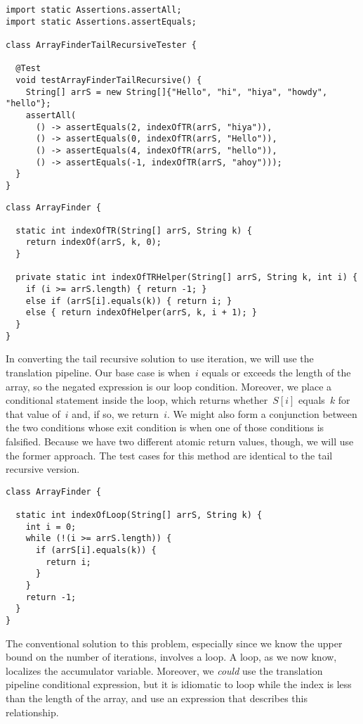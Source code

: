 \begin{lstlisting}[language=MyJava]
import static Assertions.assertAll;
import static Assertions.assertEquals;

class ArrayFinderTailRecursiveTester {

  @Test
  void testArrayFinderTailRecursive() {
    String[] arrS = new String[]{"Hello", "hi", "hiya", "howdy", "hello"};
    assertAll(
      () -> assertEquals(2, indexOfTR(arrS, "hiya")),
      () -> assertEquals(0, indexOfTR(arrS, "Hello")),
      () -> assertEquals(4, indexOfTR(arrS, "hello")),
      () -> assertEquals(-1, indexOfTR(arrS, "ahoy")));
  }
}
\end{lstlisting}

\begin{lstlisting}[language=MyJava]
class ArrayFinder {

  static int indexOfTR(String[] arrS, String k) {
    return indexOf(arrS, k, 0);
  }

  private static int indexOfTRHelper(String[] arrS, String k, int i) {
    if (i >= arrS.length) { return -1; } 
    else if (arrS[i].equals(k)) { return i; } 
    else { return indexOfHelper(arrS, k, i + 1); }
  } 
}
\end{lstlisting}

In converting the tail recursive solution to use iteration, we will use the translation pipeline. 
Our base case is when~$i$ equals or exceeds the length of the array, so the negated expression is our loop condition. 
Moreover, we place a conditional statement inside the loop, which returns whether~$S[i]$ equals~$k$ for that value of~$i$ and, if so, we return~$i$. 
We might also form a conjunction between the two conditions whose exit condition is when one of those conditions is falsified. 
Because we have two different atomic return values, though, we will use the former approach. 
The test cases for this method are identical to the tail recursive version.

\begin{lstlisting}[language=MyJava]
class ArrayFinder {

  static int indexOfLoop(String[] arrS, String k) {
    int i = 0;
    while (!(i >= arrS.length)) {
      if (arrS[i].equals(k)) { 
        return i; 
      }
    }
    return -1;
  }
}
\end{lstlisting}

The conventional solution to this problem, especially since we know the upper bound on the number of iterations, involves a  loop. 
A  loop, as we now know, localizes the accumulator variable. 
Moreover, we \emph{could} use the translation pipeline conditional expression, but it is idiomatic to loop while the index is less than the length of the array, and use an expression that describes this relationship.

